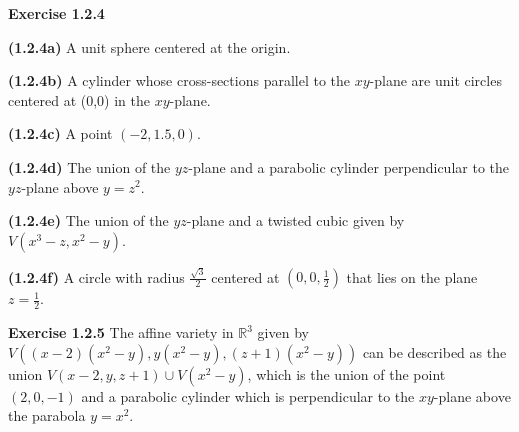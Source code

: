 \documentclass[12pt,oneside]{article}
\newenvironment{exercise}[1]{\vspace{.1in}\noindent\textbf{Exercise #1 \hspace{.05em}}}{}
\newcommand{\R}{\mathbb{R}}
\begin{document}
\newpage
\begin{exercise}{1.2.4}

    \bigskip
    \textbf{(1.2.4a)}
    A unit sphere centered at the origin.

    \bigskip
    \textbf{(1.2.4b)}
    A cylinder whose cross-sections parallel to the $xy$-plane are unit circles centered at 
    (0,0) in the $xy$-plane.

    \bigskip
    \textbf{(1.2.4c)}
    A point $(-2,1.5,0)$.

    \bigskip
    \textbf{(1.2.4d)}
    The union of the $yz$-plane and a parabolic cylinder perpendicular to the $yz$-plane above 
    $y=z^2$.

    \bigskip
    \textbf{(1.2.4e)}
    The union of the $yz$-plane and a twisted cubic given by $V(x^3-z,x^2-y)$.

    \bigskip
    \textbf{(1.2.4f)}
    A circle with radius $\frac{\sqrt{3}}{2}$ centered at $(0,0,\frac{1}{2})$ that lies on 
    the plane $z = \frac{1}{2}$.
\end{exercise}


\begin{exercise}{1.2.5}
    The affine variety in $\R^3$ given by $V((x-2)(x^2-y),y(x^2-y),(z+1)(x^2-y))$ can be
    described as the union $V(x-2,y,z+1)\cup V(x^2-y)$, which is the union of the point 
    $(2,0,-1)$ and a parabolic cylinder which is perpendicular to the $xy$-plane above the 
    parabola $y=x^2$.
\end{exercise}

\end{document}
